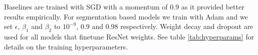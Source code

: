 Baselines are trained with SGD with a momentum of $0.9$ \cite{rumelhart_backprop}
as it provided better results empirically. For segmentation based models we train with
Adam \cite{kingma_adam} and we set $\epsilon$, $\beta_1$ and $\beta_2$ to $10^{-9}$, $0.9$ and $0.98$ respectively.
Weight decay and dropout are used for all models that finetune ResNet weights.
See table \ref{tab:hyperparams} for details on the training hyperparameters.
